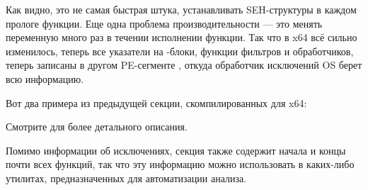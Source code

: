 
\label{SEH_win64}
Как видно, это не самая быстрая штука, устанавливать SEH-структуры в каждом прологе функции.
Еще одна проблема производительности --- это менять переменную 
 много раз в течении исполнении функции.
Так что в x64 всё сильно изменилось, теперь все указатели на -блоки, функции фильтров и обработчиков,
теперь записаны в другом PE-сегменте
 , откуда обработчик исключений \ac{OS} берет всю информацию.

Вот два примера из предыдущей секции, скомпилированных для x64:





Смотрите \IgorSkochinsky для более детального описания.

Помимо информации об исключениях, секция  
также содержит начала и концы почти всех функций, так что эту информацию можно использовать в каких-либо
утилитах, предназначенных для автоматизации анализа.


